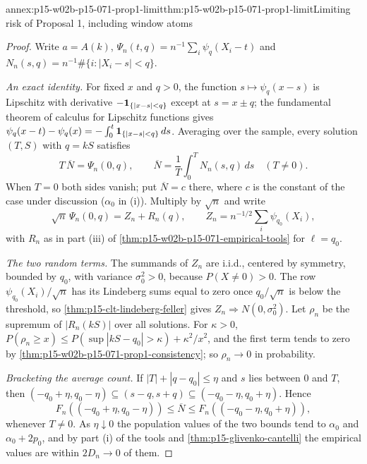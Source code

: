 \begin{annexitem}{annex:p15-w02b-p15-071-prop1-limit}{thm:p15-w02b-p15-071-prop1-limit}{Limiting risk of Proposal 1, including window atoms}
\begin{proof}
Write \(a=A(k)\), \(\Psi_n(t,q)=n^{-1}\sum_i\psi_q(X_i-t)\) and
\(N_n(s,q)=n^{-1}\#\{i:|X_i-s|<q\}\).

\emph{An exact identity.} For fixed \(x\) and \(q>0\), the function
\(s\mapsto\psi_q(x-s)\) is Lipschitz with derivative
\(-{\bf1}_{\{|x-s|<q\}}\) except at \(s=x\pm q\); the fundamental
theorem of calculus for Lipschitz functions gives
\(\psi_q(x-t)-\psi_q(x)=-\int_0^t{\bf1}_{\{|x-s|<q\}}\,ds\).
Averaging over the sample, every solution \((T,S)\) with \(q=kS\)
satisfies
\[
 T\,\overline N=\Psi_n(0,q),\qquad
 \overline N=\frac1T\int_0^TN_n(s,q)\,ds\quad(T\neq0).
\]
When \(T=0\) both sides vanish; put \(\overline N=c\) there, where
\(c\) is the constant of the case under discussion (\(\alpha_0\) in
(i)). Multiply by \(\sqrt n\) and write
\[
 \sqrt n\,\Psi_n(0,q)=Z_n+R_n(q),\qquad
 Z_n=n^{-1/2}\sum_i\psi_{q_0}(X_i),
\]
with \(R_n\) as in part (iii) of
\cref{thm:p15-w02b-p15-071-empirical-tools} for \(\ell=q_0\).

\emph{The two random terms.} The summands of \(Z_n\) are i.i.d.,
centered by symmetry, bounded by \(q_0\), with variance
\(\sigma_0^2>0\), because \(P(X\neq0)>0\). The row
\(\psi_{q_0}(X_i)/\sqrt n\) has its Lindeberg sums equal to zero once
\(q_0/\sqrt n\) is below the threshold, so
\cref{thm:p15-clt-lindeberg-feller} gives
\(Z_n\Rightarrow N(0,\sigma_0^2)\). Let \(\rho_n\) be the supremum of
\(|R_n(kS)|\) over all solutions. For \(\kappa>0\),
\(P(\rho_n\geq x)\leq P(\sup|kS-q_0|>\kappa)+\kappa^2/x^2\), and the
first term tends to zero by
\cref{thm:p15-w02b-p15-071-prop1-consistency}; so \(\rho_n\to0\) in
probability.

\emph{Bracketing the average count.} If \(|T|+|q-q_0|\leq\eta\) and
\(s\) lies between \(0\) and \(T\), then
\((-q_0+\eta,q_0-\eta)\subseteq(s-q,s+q)\subseteq(-q_0-\eta,q_0+\eta)\).
Hence
\[
 F_n((-q_0+\eta,q_0-\eta))\leq\overline N\leq
 F_n((-q_0-\eta,q_0+\eta)),
\]
whenever \(T\neq0\). As \(\eta\downarrow0\) the population values of the
two bounds tend to \(\alpha_0\) and \(\alpha_0+2p_0\), and by part (i) of
the tools and \cref{thm:p15-glivenko-cantelli} the empirical values are
within \(2D_n\to0\) of them.


\end{proof}
\end{annexitem}
